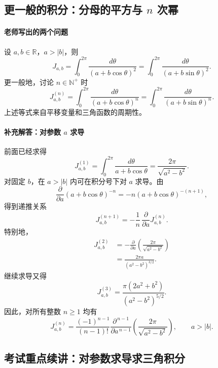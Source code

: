 \subsection*{更一般的积分：分母的平方与 $n$ 次幂}

\paragraph{老师写出的两个问题}
设 $a,b\in\mathbb R$，$a>|b|$，则
\[
  J_{a,b}
  =\int_0^{2\pi}\frac{d\theta}{(a+b\cos\theta)^2}
  =\int_0^{2\pi}\frac{d\theta}{(a+b\sin\theta)^2}.
\]
更一般地，讨论 $n\in\mathbb N^+$ 时
\[
  J_{a,b}^{(n)}
  =\int_0^{2\pi}\frac{d\theta}{(a+b\cos\theta)^n}
  =\int_0^{2\pi}\frac{d\theta}{(a+b\sin\theta)^n}.
\]
上述等式来自平移变量和三角函数的周期性。

\paragraph{补充解答：对参数 $a$ 求导}
前面已经求得
\[
  J_{a,b}^{(1)}
  =\int_0^{2\pi}\frac{d\theta}{a+b\cos\theta}
  =\frac{2\pi}{\sqrt{a^2-b^2}}.
\]
对固定 $b$，在 $a>|b|$ 内可在积分号下对 $a$
求导。由
\[
  \frac{\partial}{\partial a}
     (a+b\cos\theta)^{-n}
   =-n(a+b\cos\theta)^{-(n+1)},
\]
得到递推关系
\[
  \boxed{J_{a,b}^{(n+1)}
    =-\frac1n\,\frac{\partial}{\partial a}
                   J_{a,b}^{(n)}.}
\]
特别地，
\begin{align*}
  J_{a,b}^{(2)}
  &=-\frac{\partial}{\partial a}
       \left(\frac{2\pi}{\sqrt{a^2-b^2}}\right)\\
  &=\boxed{\frac{2\pi a}{(a^2-b^2)^{3/2}}}.
\end{align*}
继续求导又得
\[
  J_{a,b}^{(3)}
  =\frac{\pi(2a^2+b^2)}{(a^2-b^2)^{5/2}}.
\]
因此，对所有整数 $n\ge1$ 均有
\[
  \boxed{
    J_{a,b}^{(n)}
    =\frac{(-1)^{n-1}}{(n-1)!}
       \frac{\partial^{\,n-1}}{\partial a^{\,n-1}}
       \left(\frac{2\pi}{\sqrt{a^2-b^2}}\right),
    \qquad a>|b|.
  }
\]


\subsection*{考试重点续讲：对参数求导求三角积分}

